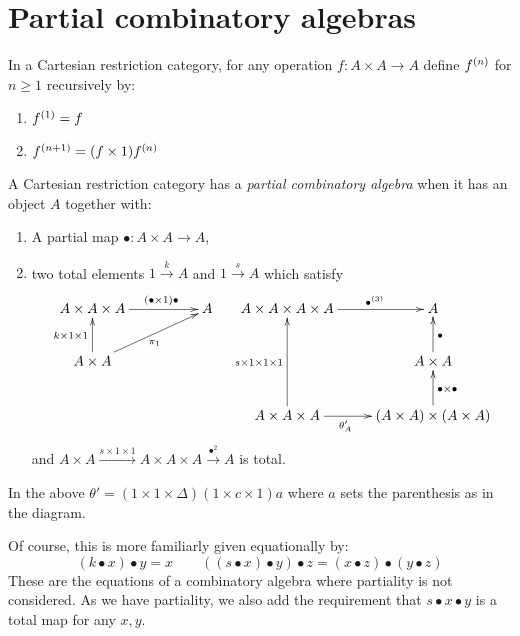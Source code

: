 \section{Partial combinatory algebras}
\label{sec:partial_combinatory_algebras}

In a Cartesian restriction category, for any operation $f:A\times A\to A$ define ${f}^{(n)}$
for $n\ge 1$  recursively by:
\begin{enumerate}[{(}i{)}]
  \item ${f}^{(1)} = f$
  \item ${f}^{(n+1)} = (f\times 1) {f}^{(n)}$
\end{enumerate}

\begin{definition}\label{def:partial_combinatory_algebra}
  A Cartesian restriction category has a \emph{partial combinatory algebra} when it has an object
  $A$ together with:
  \begin{enumerate}[{(}i{)}]
  \item A partial map $\bullet:A\times A \to A$,
  \item two total elements $1\xrightarrow{k}A$ and $1\xrightarrow{s}{A}$ which satisfy
    \[
      \xymatrix@C+25pt{
        A\times A\times A \ar[r]^(.6){(\bullet\times 1)\bullet} & A\\
        A\times A \ar[u]^{k\times1\times1} \ar[ur]_{\pi_1}
      }\quad
      \xymatrix{
        A\times A\times A\times A \ar[r]^(.6){\multibullet{3}}&A\\
        &A\times A \ar[u]_{\bullet}\\
        A\times A\times A \ar[uu]^{s\times1\times1\times1} \ar[r]_(.4){\theta_A'}
          & (A\times A) \times (A\times A) \ar[u]_{\bullet\times\bullet}
      }
    \]
    and $A\times A \xrightarrow{s\times1\times1} A\times A\times A \xrightarrow{\bullet^2} A$ is total.
  \end{enumerate}
  In the above $\theta' = (1\times1\times\Delta)(1\times c \times 1)a$ where $a$ sets the
  parenthesis as in the diagram.
\end{definition}

Of course, this is more familiarly given equationally by:
\[
   (k\bullet x)\bullet y = x \qquad ((s\bullet x)\bullet y) \bullet z = (x\bullet z) \bullet
   (y\bullet z)
\]
These are the equations of a combinatory algebra where partiality is not considered. As we have
partiality, we also add the requirement that $s\bullet x\bullet y$ is a total map for any $x,y$.

